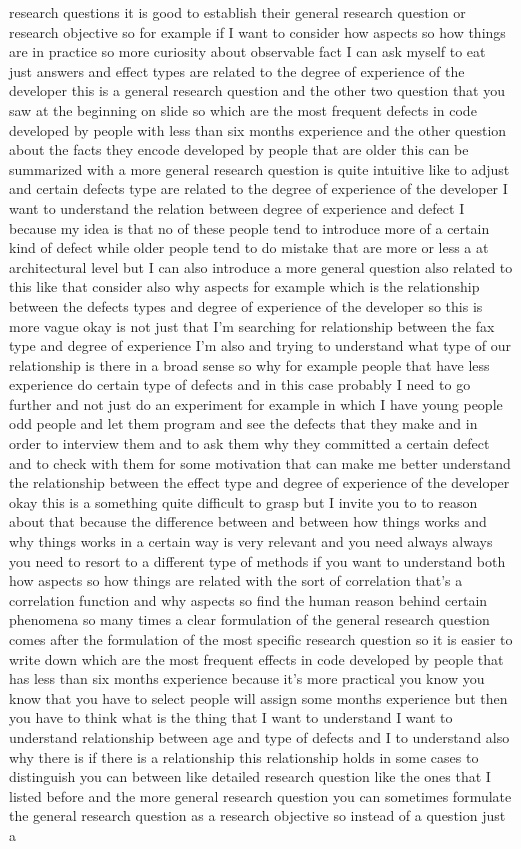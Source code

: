 \documentclass[conference, compsoc, twoside]{IEEEtran}
\begin{document}
research questions it is good to establish their general research question or research objective so for example if I want to consider how aspects so how things are in practice so more curiosity about observable fact I can ask myself to eat just answers and effect types are related to the degree of experience of the developer this is a general research question and the other two question that you saw at the beginning on slide so which are the most frequent defects in code developed by people with less than six months experience and the other question about the facts they encode developed by people that are older this can be summarized with a more general research question is quite intuitive like to adjust and certain defects type are related to the degree of experience of the developer I want to understand the relation between degree of experience and defect I because my idea is that no of these people tend to introduce more of a certain kind of defect while older people tend to do mistake that are more or less a at architectural level but I can also introduce a more general question also related to this like that consider also why aspects for example which is the relationship between the defects types and degree of experience of the developer so this is more vague okay is not just that I'm searching for relationship between the fax type and degree of experience I'm also and trying to understand what type of our relationship is there in a broad sense so why for example people that have less experience do certain type of defects and in this case probably I need to go further and not just do an experiment for example in which I have young people odd people and let them program and see the defects that they make and in order to interview them and to ask them why they committed a certain defect and to check with them for some motivation that can make me better understand the relationship between the effect type and degree of experience of the developer okay this is a something quite difficult to grasp but I invite you to to reason about that because the difference between and between how things works and why things works in a certain way is very relevant and you need always always you need to resort to a different type of methods if you want to understand both how aspects so how things are related with the sort of correlation that's a correlation function and why aspects so find the human reason behind certain phenomena so many times a clear formulation of the general research question comes after the formulation of the most specific research question so it is easier to write down which are the most frequent effects in code developed by people that has less than six months experience because it's more practical you know you know that you have to select people will assign some months experience but then you have to think what is the thing that I want to understand I want to understand relationship between age and type of defects and I to understand also why there is if there is a relationship this relationship holds in some cases to distinguish you can between like detailed research question like the ones that I listed before and the more general research question you can sometimes formulate the general research question as a research objective so instead of a question just a 
\end{document}
